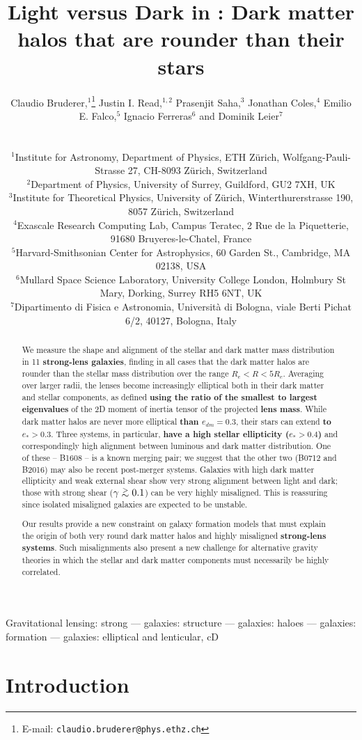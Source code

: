 \documentclass[useAMS,usenatbib]{mn2e}
\title[Light versus Dark in \cb{Strong-Lens Galaxies}]{Light versus Dark in \cb{Strong-Lens Galaxies}: Dark matter halos that are rounder than their stars}
\author[Bruderer et al.]
{\parbox{\textwidth}{Claudio Bruderer,$^{1}$\thanks{E-mail: \texttt{claudio.bruderer@phys.ethz.ch}}
Justin I. Read,$^{1,2}$
Prasenjit Saha,$^{3}$
Jonathan Coles,$^{4}$
Emilio E. Falco,$^{5}$
Ignacio Ferreras$^{6}$ and
Dominik Leier$^{7}$}\vspace{0.4cm}\\
\parbox{\textwidth}{$^{1}$Institute for Astronomy, Department of Physics, ETH Z\"urich, Wolfgang-Pauli-Strasse 27, CH-8093 Z\"urich, Switzerland\\
$^{2}$Department of Physics, University of Surrey, Guildford, GU2 7XH, UK\\
$^{3}$Institute for Theoretical Physics, University of Z\"urich, Winterthurerstrasse 190, 8057 Z\"urich, Switzerland\\
$^{4}$Exascale Research Computing Lab, Campus Teratec, 2 Rue de la Piquetterie, 91680 Bruyeres-le-Chatel, France\\
$^{5}$Harvard-Smithsonian Center for Astrophysics, 60 Garden St., Cambridge, MA 02138, USA\\
$^{6}$Mullard Space Science Laboratory, University College London, Holmbury St Mary, Dorking, Surrey RH5 6NT, UK\\
$^{7}$Dipartimento di Fisica e Astronomia, Università di Bologna, viale Berti Pichat 6/2, 40127, Bologna, Italy}}
\def\gtsima{$\; \buildrel > \over \sim \;$}
\def\simgt{\lower.5ex\hbox{\gtsima}}
\newcommand{\cb}[1]{{\color{red} \textbf{#1}}}
\begin{document}
\maketitle

\begin{abstract}
We measure the shape and alignment of the stellar and dark matter mass distribution in 11 \cb{strong-lens galaxies}, finding in all cases that the dark matter halos are rounder than the stellar mass distribution over the range $R_e < R < 5R_e$.  Averaging over larger radii, the lenses become increasingly elliptical both in their dark matter and stellar components, as defined \cb{using the ratio of the smallest to largest eigenvalues} of the 2D moment of inertia tensor of the projected \cb{lens mass}.  While dark matter halos are never more elliptical \cb{than $e_{dm} = 0.3$}, their stars can extend \cb{to $e_* > 0.3$}. Three systems, in particular, \cb{have a high stellar ellipticity ($e_* > 0.4$)} and correspondingly high alignment between luminous and dark matter distribution. One of these -- B1608 -- is a known merging pair; we suggest that the other two (B0712 and B2016) may also be recent post-merger systems.  Galaxies with high dark matter ellipticity and weak external shear show very strong alignment between light and dark; those with strong shear ($\gamma \simgt 0.1$) can be very highly misaligned. This is reassuring since isolated misaligned galaxies are expected to be unstable. 

Our results provide a new constraint on galaxy formation models that must explain the origin of both very round dark matter halos and highly misaligned \cb{strong-lens systems}. Such misalignments also present a new challenge for alternative gravity theories in which the stellar and dark matter components must necessarily be highly correlated.

\end{abstract}

\begin{keywords}
Gravitational lensing: strong --- galaxies: structure --- galaxies: haloes --- galaxies: formation --- galaxies: elliptical and lenticular, cD
\end{keywords}


\section{Introduction}\label{sec:introduction}
\end{document}
